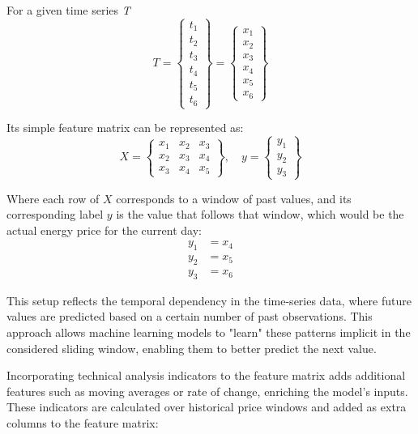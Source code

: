 \documentclass[12pt]{report} %
\begin{document}
For a given time series \textit{T}
\begin{equation*}
{T} = \begin{Bmatrix}
t_1 \\
t_2 \\
t_3 \\
t_4 \\
t_5 \\
t_6
\end{Bmatrix} = \begin{Bmatrix}
x_1 \\
x_2 \\
x_3 \\
x_4 \\
x_5 \\
x_6
\end{Bmatrix}
\end{equation*}

Its simple feature matrix can be represented as:
\begin{equation*}
{X} = \begin{Bmatrix}
x_1 & x_2 & x_3 \\
x_2 & x_3 & x_4 \\
x_3 & x_4 & x_5
\end{Bmatrix}, \quad
{y} = \begin{Bmatrix}
y_1 \\
y_2 \\
y_3
\end{Bmatrix}
\end{equation*}

Where each row of $\mathit{X}$ corresponds to a window of past values, and its corresponding label $\mathit{y}$ is the value that follows that window, which would be the actual energy price for the current day:
\begin{align*}
y_1 &= x_4 \\
y_2 &= x_5 \\
y_3 &= x_6
\end{align*}

This setup reflects the temporal dependency in the time-series data, where future values are predicted based on a certain number of past observations. This approach allows machine learning models to "learn" these patterns implicit in the considered sliding window, enabling them to better predict the next value.

Incorporating technical analysis indicators to the feature matrix adds additional features such as moving averages or rate of change, enriching the model’s inputs. These indicators are calculated over historical price windows and added as extra columns to the feature matrix:
\end{document}
